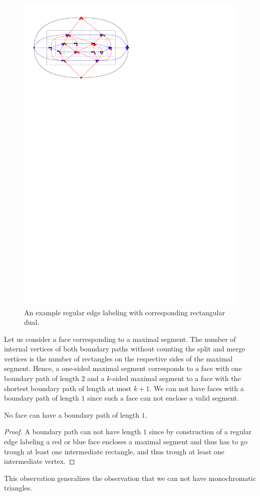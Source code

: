     \begin{figure}[t]
      \centering
      \includegraphics[scale=1]{rectangularDuals/img/relSegmentFaceRescale}
      \caption{An example regular edge labeling with corresponding rectangular dual.}
      \label{fig:rect:relSegmentFace}
    \end{figure}

    Let us consider a face corresponding to a maximal segment.
    The number of internal vertices of both boundary paths without counting the split and merge vertices is the number of rectangles on the respective sides of the maximal segment.
    Hence, a one-sided maximal segment corresponds to a face with one boundary path of length $2$  and a $k$-sided maximal segment to a face with the shortest boundary path of length at most $k+1$.
    We can not have faces with a boundary path of length $1$ since such a face can not enclose a valid segment.

    \begin{observation}
      \label{obs:rel:noBpOfLength1}
      No face can have a boundary path of length $1$.
    \end{observation}
    \begin{proof}
      A boundary path can not have length $1$ since by construction of a regular edge labeling a red or blue face encloses a maximal segment and thus has to go trough at least one intermediate rectangle, and thus trough at least one intermediate vertex.
    \end{proof}

    This observation generalizes the observation that we can not have monochromatic triangles.
